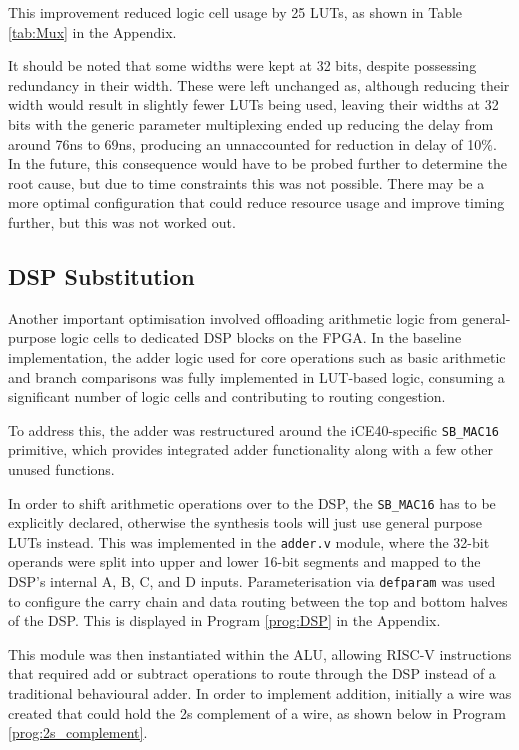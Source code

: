 \documentclass[a4paper,10pt]{article}
\begin{document}
This improvement reduced logic cell usage by 25 LUTs, as shown in 
Table \ref{tab:Mux} in the Appendix.

It should be noted that some widths were kept at 32 bits,
despite possessing redundancy in their width.
These were left unchanged as, 
although reducing their width would result in slightly fewer LUTs being used,
leaving their widths at 32 bits with the generic parameter multiplexing 
ended up reducing the delay from around 76ns to 69ns,
producing an unnaccounted for reduction in delay of 10\%.
In the future, this consequence would have to be probed further
to determine the root cause, but due to time constraints this was not possible.
There may be a more optimal configuration that could reduce resource usage
and improve timing further, but this was not worked out.

\subsection{DSP Substitution}
\label{sec:DSP}

Another important optimisation involved offloading arithmetic logic 
from general-purpose logic cells to dedicated DSP blocks on the FPGA. 
In the baseline implementation, the adder logic used for core operations 
such as basic arithmetic and branch comparisons was fully implemented in LUT-based logic, 
consuming a significant number of logic cells and contributing to routing congestion. 

To address this, the adder was restructured around 
the iCE40-specific \texttt{SB\_MAC16} primitive, 
which provides integrated adder functionality
along with a few other unused functions. 

In order to shift arithmetic operations over to the DSP,
the \texttt{SB\_MAC16} has to be explicitly declared,
otherwise the synthesis tools will just use general purpose LUTs instead.
This was implemented in the \texttt{adder.v} module, 
where the 32-bit operands were split into upper and lower 16-bit segments 
and mapped to the DSP's internal A, B, C, and D inputs. 
Parameterisation via \texttt{defparam} was used to configure the carry chain 
and data routing between the top and bottom halves of the DSP.
This is displayed in Program \ref{prog:DSP} in the Appendix.

This module was then instantiated within the ALU, allowing RISC-V instructions 
that required add or subtract operations to route through the DSP instead 
of a traditional behavioural adder. 
In order to implement addition, initially a wire was created that could
hold the 2s complement of a wire, as shown below in Program \ref{prog:2s_complement}.
\end{document}
